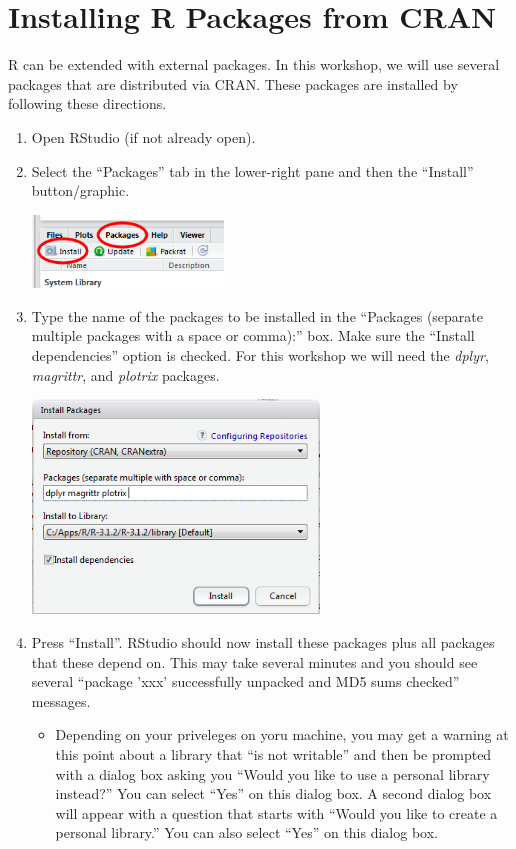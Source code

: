 \documentclass{article}\usepackage[]{graphicx}\usepackage[]{color}
\begin{document}
\newpage
\section{Installing R Packages from CRAN}
R can be extended with external packages.  In this workshop, we will use several packages that are distributed via CRAN.  These packages are installed by following these directions.
\begin{enumerate}
  \item Open RStudio (if not already open).

  \item Select the ``Packages'' tab in the lower-right pane and then the ``Install'' button/graphic.
\begin{center}
  \includegraphics[width=2in]{Figs/RStudio_Prep_InstallPkgs_Icons.png}
\end{center}

  \item Type the name of the packages to be installed in the ``Packages (separate multiple packages with a space or comma):'' box.  Make sure the ``Install dependencies'' option is checked.  For this workshop we will need the \textit{dplyr}, \textit{magrittr}, and \textit{plotrix} packages.
\begin{center}
  \includegraphics[width=3in]{Figs/RStudio_Prep_InstallPkgs_Choose.png}
\end{center}
  \item Press ``Install''.  RStudio should now install these packages plus all packages that these depend on.  This may take several minutes and you should see several ``package 'xxx' successfully unpacked and MD5 sums checked'' messages.
  \begin{itemize}
    \item Depending on your priveleges on yoru machine, you may get a warning at this point about a library that ``is not writable'' and then be prompted with a dialog box asking you ``Would you like to use a personal library instead?''  You can select ``Yes'' on this dialog box.  A second dialog box will appear with a question that starts with ``Would you like to create a personal library.''  You can also select ``Yes'' on this dialog box.
  \end{itemize}
\end{enumerate}
\end{document}
